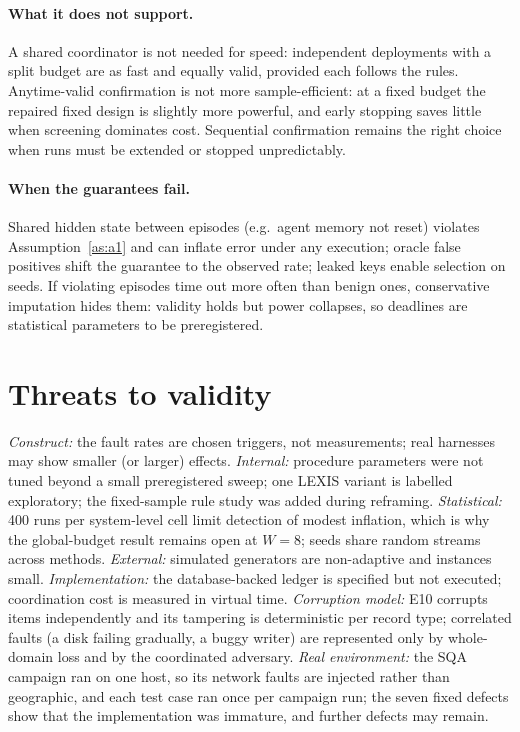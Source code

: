 \documentclass[pdflatex,sn-mathphys-num]{sn-jnl}
\theoremstyle{thmstyleone}
\theoremstyle{thmstyletwo}
\theoremstyle{thmstylethree}
\begin{document}
\paragraph{What it does not support.} A shared coordinator is not needed for speed: independent deployments with a split budget are as fast and equally valid, provided each follows the rules. Anytime-valid confirmation is not more sample-efficient: at a fixed budget the repaired fixed design is slightly more powerful, and early stopping saves little when screening dominates cost. Sequential confirmation remains the right choice when runs must be extended or stopped unpredictably.

\paragraph{When the guarantees fail.} Shared hidden state between episodes (e.g.\ agent memory not reset) violates Assumption~\ref{as:a1} and can inflate error under any execution; oracle false positives shift the guarantee to the observed rate; leaked keys enable selection on seeds. If violating episodes time out more often than benign ones, conservative imputation hides them: validity holds but power collapses, so deadlines are statistical parameters to be preregistered.

\section{Threats to validity}\label{sec:threats}
\textit{Construct:} the fault rates are chosen triggers, not measurements; real harnesses may show smaller (or larger) effects. \textit{Internal:} procedure parameters were not tuned beyond a small preregistered sweep; one LEXIS variant is labelled exploratory; the fixed-sample rule study was added during reframing. \textit{Statistical:} 400 runs per system-level cell limit detection of modest inflation, which is why the global-budget result remains open at $W=8$; seeds share random streams across methods. \textit{External:} simulated generators are non-adaptive and instances small. \textit{Implementation:} the database-backed ledger is specified but not executed; coordination cost is measured in virtual time. \textit{Corruption model:} E10 corrupts items independently and its tampering is deterministic per record type; correlated faults (a disk failing gradually, a buggy writer) are represented only by whole-domain loss and by the coordinated adversary. \textit{Real environment:} the SQA campaign ran on one host, so its network faults are injected rather than geographic, and each test case ran once per campaign run; the seven fixed defects show that the implementation was immature, and further defects may remain.
\end{document}
